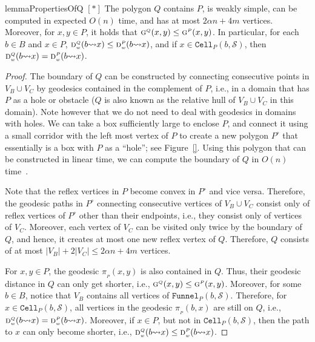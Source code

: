 \documentclass[a4paper,UKenglish]{socg-lipics-v2018}
\newcommand{\s}{\mathcal S}
\newcommand{\g}[3][P]{\ensuremath{\textsc{g}^{\scriptscriptstyle #1}(#2, #3)}}
\newcommand{\dd}[3][P]{\ensuremath{\textsc{d}_{\scriptscriptstyle w}^{\scriptscriptstyle #1}(#2 {\leadsto} #3)}}
\newcommand{\p}[3][P]{\ensuremath{\pi_{_{#1}}(#2, #3)}}
\newcommand{\funnel}[2][P]{\ensuremath{\mathtt{Funnel}_{\scriptscriptstyle #1}(#2)}}
\newcommand{\cell}[2][P]{\ensuremath{\mathtt{Cell}_{\scriptscriptstyle #1}(#2)}}
\begin{document}
\begin{restatable}{lemma}{PropertiesOfQ}\label{lemma:PropertiesOfQ}
$[*]$ The polygon $Q$ contains $P$, is weakly simple, can be computed in expected $O(n)$ time, and has at most $2\alpha n + 4m$ vertices.
Moreover, for $x,y\in P$, it holds that $\g[Q]{x}{y} \leq \g{x}{y}$. 
In particular, for each $b\in B$ and $x\in P$, $\dd[Q]{b}{x} \leq \dd{b}{x}$, and if $x\in \cell{b, \s}$, then $\dd[Q]{b}{x} = \dd{b}{x}$.
\end{restatable}
\begin{proof}
The boundary of $Q$ can be constructed by connecting consecutive  points in $V_B\cup V_C$ by geodesics contained in the complement of $P$, i.e., in a domain that has $P$ as a hole or obstacle ($Q$ is also known as the relative hull of $V_B\cup V_C$ in this domain). 
Note however that we do not need to deal with geodesics in domains with holes. 
We can take a box sufficiently large to enclose $P$, and connect it using a small corridor with the left most vertex of $P$ to create a new polygon $P^\circ$ that essentially is a box with $P$ as a ``hole''; see Figure~\ref{}. 
Using this polygon that can be constructed in linear time, we can compute the boundary of $Q$ in $O(n)$ time~\cite[Lemma 2]{kpairpath}.

Note that the reflex vertices in $P$ become convex in $P^\circ$ and vice versa. 
Therefore, the geodesic paths in $P^\circ$ connecting consecutive vertices of $V_B\cup V_C$ consist only of reflex vertices of $P^\circ$ other than their endpoints, i.e., they consist only of vertices of $V_C$.  
Moreover, each vertex of $V_C$ can be visited only twice by the boundary of $Q$, and hence, it creates at most one new reflex vertex of $Q$.
Therefore, $Q$ consists of at most $|V_B| +  2|V_C| \leq 2\alpha n + 4m$ vertices.

For $x,y\in P$, the geodesic $\p{x}{y}$ is also contained in $Q$. Thus, their geodesic distance in $Q$ can only get shorter, i.e., $\g[Q]{x}{y} \leq \g{x}{y}$.
Moreover, for some $b\in B$, notice that $V_B$ contains all vertices of $\funnel{b, \s}$. Therefore, for $x\in \cell{b,\s}$, all vertices in the geodesic $\p{b}{x}$ are still on $Q$, i.e., $\dd[Q]{b}{x} = \dd{b}{x}$. Moreover, if $x\in P$, but not in $\cell{b,\s}$, then the path to $x$ can only become shorter, i.e., $\dd[Q]{b}{x} \leq \dd{b}{x}$.
\end{proof}
\end{document}
